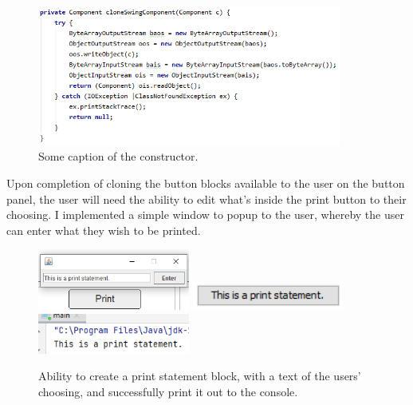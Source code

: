 \documentclass[a4paper, 12pt]{article}
\begin{document}
            \begin{figure}[h]
                \centering
                \includegraphics[width=100mm]{copy_constructor.png}
                \caption{Some caption of the constructor.}
            \end{figure}
        
            Upon completion of cloning the button blocks available to the user on the button panel,
            the user will need the ability to edit what's inside the print button to their choosing.
            I implemented a simple window to popup to the user, whereby the user can enter what they
            wish to be printed.

            \begin{figure}[h]
                \includegraphics[width=50mm]{print_statement1.png}
                \includegraphics[width=50mm]{print_statement2.png}
                \includegraphics[width=50mm]{print_statement3.png}
                \caption{Ability to create a print statement block, with a text of the users' choosing,
                and successfully print it out to the console.}
            \end{figure}

        \clearpage
\end{document}
